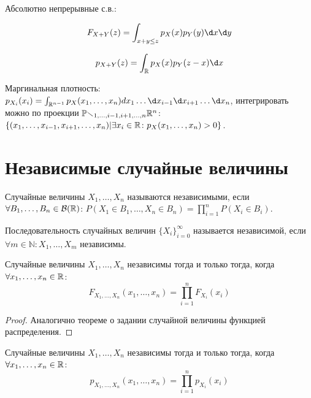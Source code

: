 \documentclass[12pt, a4paper, oneside]{article}
\begin{document}
Абсолютно непрерывные с.в.:

\begin{equation}
    F_{X + Y}(z) = \int_{x + y \le z} p_X(x) p_Y(y) \d x \d y
\end{equation}

\begin{equation}
    p_{X + Y}(z) = \int_{\sR} p_X(x) p_Y(z - x) \d x
\end{equation}



Маргинальная плотность: $p_{X_i}(x_i) = \int_{\mathbb{R}^{n - 1}} p_X(x_1, \ldots, x_n) dx_1 \ldots \d x_{i - 1} \d x_{i + 1} \ldots \d x_n$, интегрировать можно по проекции
$\mathbb{Pr}_{1, \ldots, i - 1, i + 1, \ldots, n} {\mathbb{R}}^n$: $\{ (x_1, \ldots, x_{i - 1}, x_{i + 1}, \ldots, x_n) | \exists x_i \in {\mathbb{R}} \colon p_X(x_1, \ldots, x_n) > 0 \}$.


\section{Независимые случайные величины}

\begin{definition}
    Случайные величины $X_1, \ldots, X_n$ называются независимыми, если $\forall B_1, \ldots, B_n \in \mathcal{B}({\mathbb{R}})$: $P(X_1 \in B_1, \ldots, X_n \in B_n) = \prod_{i=1}^{n} P(X_i \in B_i)$.
\end{definition}

\begin{definition}
    Последовательность случайных величин $\{ X_i \}_{i = 0}^∞$ называется независимой, если $\forall m \in \mathbb{N}\colon X_1, \ldots, X_m$ независимы.
\end{definition}

\begin{theorem}
    Случайные величины $X_1, \ldots, X_n$ независимы тогда и только тогда, когда $\forall x_1, \ldots, x_n \in {\mathbb{R}}$:
    \begin{equation}
        F_{X_1, \ldots, X_n}(x_1, \ldots, x_n) = \prod_{i=1}^{n} F_{X_i}(x_i)
    \end{equation}    
\end{theorem}

\begin{proof}
    Аналогично теореме о задании случайной величины функцией распределения.
\end{proof}

\begin{theorem}
    Случайные величины $X_1, \ldots, X_n$ независимы тогда и только тогда, когда $\forall x_1, \ldots, x_n \in {\mathbb{R}}$:
    \begin{equation}
        p_{X_1, \ldots, X_n}(x_1, \ldots, x_n) = \prod_{i=1}^{n} p_{X_i}(x_i)
    \end{equation}
\end{theorem}
\end{document}
